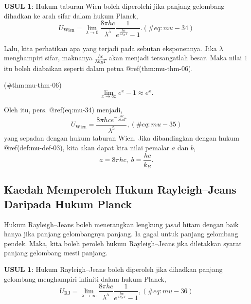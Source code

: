 \documentclass[
]{book}
\begin{document}
\textbf{USUL 1}: Hukum taburan Wien boleh diperolehi jika panjang
gelombang dihadkan ke arah sifar dalam hukum Planck, \begin{equation}
U_{\text{Wien}}=\lim_{\lambda\to 0}\frac{8\pi hc}{\lambda^5}\frac{1}{e^{\frac{hc}{\lambda k_BT}}-1}.
(\#eq:mu-34)
\end{equation}

Lalu, kita perhatikan apa yang terjadi pada sebutan eksponennya. Jika
\(\lambda\) menghampiri sifar, maknanya \(\frac{hc}{\lambda k_BT}\) akan
menjadi tersangatlah besar. Maka nilai \(1\) itu boleh diabaikan seperti
dalam petua @ref(thm:mu-thm-06).

\BeginKnitrBlock{theorem}{}

\protect\hypertarget{thm:mu-thm-06}{}{(\#thm:mu-thm-06)
{}
}\begin{equation}
\lim_{x\to\infty}e^x - 1 \approx e^x.
\end{equation} 

Oleh itu, pers. @ref(eq:mu-34) menjadi, \begin{equation}
U_{\text{Wien}}=\frac{8\pi hce^{-\frac{hc}{\lambda k_BT}}}{\lambda^5},
(\#eq:mu-35)
\end{equation} yang sepadan dengan hukum taburan Wien. Jika dibandingkan
dengan hukum @ref(def:mu-def-03), kita akan dapat kira nilai pemalar
\(a\) dan \(b\), \[a = 8\pi hc,\;b = \frac{hc}{k_B}.\]

\hypertarget{sec:planck-rayleigh-jeans}{%
\subsection{Kaedah Memperoleh Hukum Rayleigh--Jeans Daripada Hukum
Planck}\label{sec:planck-rayleigh-jeans}}

Hukum Rayleigh--Jeans boleh menerangkan lengkung jasad hitam dengan baik
hanya jika panjang gelombangnya panjang. Ia gagal untuk panjang
gelombang pendek. Maka, kita boleh peroleh hukum Rayleigh--Jeans jika
diletakkan syarat panjang gelombang mesti panjang.

\textbf{USUL 1}: Hukum Rayleigh--Jeans boleh diperoleh jika dihadkan
panjang gelombang menghampiri infiniti dalam hukum Planck,
\begin{equation}
U_{\text{RJ}} = \lim_{\lambda\to\infty}\frac{8\pi hc}{\lambda^5}\frac{1}{e^{\frac{hc}{\lambda k_BT}}-1},
(\#eq:mu-36)
\end{equation}
\end{document}
